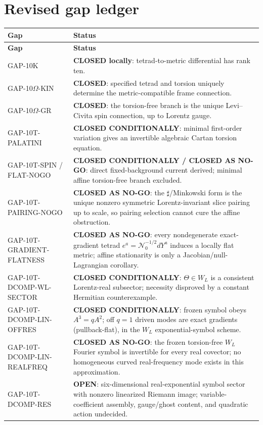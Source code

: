 \documentclass[12pt,a4paper]{article}
\theoremstyle{remark}\newtheorem{remark}[definition]{Remark}
\begin{document}
\section{Revised gap ledger}
\begin{longtable}{p{3.0cm}p{8.9cm}}
\toprule
\textbf{Gap} & \textbf{Status}\\
\midrule
\endfirsthead
\toprule
\textbf{Gap} & \textbf{Status}\\
\midrule
\endhead
\bottomrule
\endfoot
GAP-10K & \textbf{CLOSED locally}: tetrad-to-metric differential has rank ten.\\
GAP-10$\Omega$-KIN & \textbf{CLOSED}: specified tetrad and torsion uniquely determine the metric-compatible frame connection.\\
GAP-10$\Omega$-GR & \textbf{CLOSED}: the torsion-free branch is the unique Levi--Civita spin connection, up to Lorentz gauge.\\
GAP-10T-PALATINI & \textbf{CLOSED CONDITIONALLY}: minimal first-order variation gives an invertible algebraic Cartan torsion equation.\\
GAP-10T-SPIN / FLAT-NOGO & \textbf{CLOSED CONDITIONALLY / CLOSED AS NO-GO}: direct fixed-background current derived; minimal affine torsion-free branch excluded.\\
GAP-10T-PAIRING-NOGO & \textbf{CLOSED AS NO-GO}: the $\sharp$/Minkowski form is the unique nonzero symmetric Lorentz-invariant slice pairing up to scale, so pairing selection cannot cure the affine obstruction.\\
GAP-10T-GRADIENT-FLATNESS & \textbf{CLOSED AS NO-GO}: every nondegenerate exact-gradient tetrad $e^a=\mathcal N_0^{-1/2}dY^a$ induces a locally flat metric; affine stationarity is only a Jacobian/null-Lagrangian corollary.\\
GAP-10T-DCOMP-WL-SECTOR & \textbf{CLOSED CONDITIONALLY}: $\Theta\in W_L$ is a consistent Lorentz-real subsector; necessity disproved by a constant Hermitian counterexample.\\
GAP-10T-DCOMP-LIN-OFFRES & \textbf{CLOSED CONDITIONALLY}: frozen symbol obeys $A^3=qA^2$; off $q=1$ driven modes are exact gradients (pullback-flat), in the $W_L$ exponential-symbol scheme.\\
GAP-10T-DCOMP-LIN-REALFREQ & \textbf{CLOSED AS NO-GO}: the frozen torsion-free $W_L$ Fourier symbol is invertible for every real covector; no homogeneous curved real-frequency mode exists in this approximation.\\
GAP-10T-DCOMP-RES & \textbf{OPEN}: six-dimensional real-exponential symbol sector with nonzero linearized Riemann image; variable-coefficient assembly, gauge/ghost content, and quadratic action undecided.\\

\end{longtable}
\end{document}
